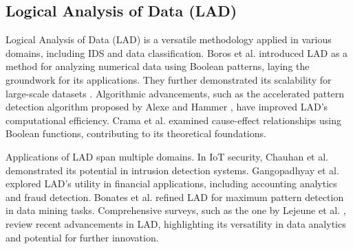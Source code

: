\documentclass[pdflatex,sn-mathphys-num]{sn-jnl}%
\theoremstyle{thmstyleone}%
\theoremstyle{thmstyletwo}%
\theoremstyle{thmstylethree}%
\begin{document}
\subsection{Logical Analysis of Data (LAD)}  
Logical Analysis of Data (LAD) is a versatile methodology applied in various domains, including IDS and data classification. Boros et al. \cite{LAD1} introduced LAD as a method for analyzing numerical data using Boolean patterns, laying the groundwork for its applications. They further demonstrated its scalability for large-scale datasets \cite{LAD2}. Algorithmic advancements, such as the accelerated pattern detection algorithm proposed by Alexe and Hammer \cite{LAD5}, have improved LAD's computational efficiency. Crama et al. \cite{LAD6} examined cause-effect relationships using Boolean functions, contributing to its theoretical foundations.

Applications of LAD span multiple domains. In IoT security, Chauhan et al. \cite{LAD7} demonstrated its potential in intrusion detection systems. Gangopadhyay et al. \cite{LAD8} explored LAD's utility in financial applications, including accounting analytics and fraud detection. Bonates et al. \cite{LAD9} refined LAD for maximum pattern detection in data mining tasks. Comprehensive surveys, such as the one by Lejeune et al. \cite{LAD4}, review recent advancements in LAD, highlighting its versatility in data analytics and potential for further innovation.
\end{document}

